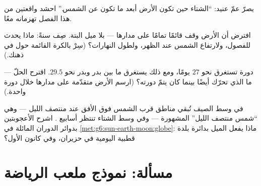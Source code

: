 \begin{exercise}[$\star\star$]\label{exo:g6:sun-earth-moon:9}
يصرّ عمّ عنيد: ``الشتاء حين تكون الأرض أبعد ما تكون عن الشمس.''
احشد واقعتين من هذا الفصل تهزمانه معًا.
\end{exercise}

\begin{exercise}[$\star\star$]\label{exo:g6:sun-earth-moon:10}
افترض أن  الأرض وقف قائمًا تمامًا على مدارها --- بلا ميل
البتة. صِف سنةً: ماذا يحدث للفصول، ولارتفاع الشمس عند الظهر،
ولطول النهارات؟ (سِرْ بالكرة القائمة حول  في ذهنك.)
\end{exercise}

\begin{exercise}[$\star\star$]\label{exo:g6:sun-earth-moon:11}
دورة  تستغرق نحو $27$ يومًا، ومع ذلك يستغرق ما بين بدر
وبدر نحو $29.5$. اقترح الحلّ --- ما الذي تحرّك أيضًا بينما كان
 يتمّ دورته؟ (ارسم الأرض متقدّمة على مدارها خلال دورة 
واحدة.)
\end{exercise}

\begin{exercise}[$\star\star\star$]\label{exo:g6:sun-earth-moon:12}
في وسط الصيف تُبقي مناطق قرب  الشمس فوق الأفق عند
منتصف الليل --- وهي ``شمس منتصف الليل'' المشهورة --- وفي وسط
الشتاء تنتظر أسابيع . اشرح الأعجوبتين بدوائر الدوران
المائلة في \cref{met:g6:sun-earth-moon:globe}: ماذا يفعل الميل
بدائرة بلدة قطبية اليومية في حزيران، وفي كانون الأول؟
\end{exercise}

\section{مسألة: نموذج ملعب الرياضة}

